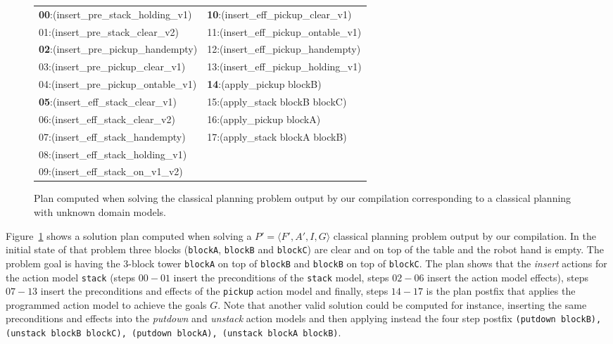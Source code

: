 \documentclass{article}
\newcommand{\tup}[1]{{\langle #1 \rangle}}
\begin{document}
\begin{figure}[hbt!]
	{\tiny\tt

\begin{tabular}{ll}
		{\bf 00}:(insert\_pre\_stack\_holding\_v1) & {\bf 10}:(insert\_eff\_pickup\_clear\_v1) \\
		01:(insert\_pre\_stack\_clear\_v2) & 11:(insert\_eff\_pickup\_ontable\_v1)\\
                {\bf 02}:(insert\_pre\_pickup\_handempty) & 12:(insert\_eff\_pickup\_handempty)\\
                03:(insert\_pre\_pickup\_clear\_v1) & 13:(insert\_eff\_pickup\_holding\_v1)\\
                04:(insert\_pre\_pickup\_ontable\_v1) & {\bf 14}:(apply\_pickup blockB)\\
                {\bf 05}:(insert\_eff\_stack\_clear\_v1) & 15:(apply\_stack blockB blockC)\\
                06:(insert\_eff\_stack\_clear\_v2) & 16:(apply\_pickup blockA)\\
                07:(insert\_eff\_stack\_handempty) & 17:(apply\_stack blockA blockB) \\
                08:(insert\_eff\_stack\_holding\_v1) & \\
                09:(insert\_eff\_stack\_on\_v1\_v2) &             		 
\end{tabular}
}
	\caption{\small Plan computed when solving the classical planning problem output by our compilation corresponding to a classical planning with unknown domain models.}
	\label{fig:plan-lplan}
\end{figure}

Figure~\ref{fig:plan-lplan} shows a solution plan computed when solving a $P'=\tup{F',A',I,G}$ classical planning problem output by our compilation. In the initial state of that problem three  blocks ({\small\tt blockA}, {\small\tt blockB} and {\small\tt blockC}) are clear and on top of the table and the robot hand is empty. The problem goal is having the 3-block tower {\tt blockA} on top of {\tt blockB} and {\tt blockB} on top of {\tt blockC}. The plan shows that the {\em insert} actions for the action model {\tt\small stack} (steps $00-01$ insert the preconditions of the {\tt\small stack} model, steps $02-06$ insert the action model effects), steps $07-13$ insert the preconditions and effects of the {\tt\small pickup} action model and finally, steps $14-17$ is the plan postfix that applies the programmed action model to achieve the goals $G$. Note that another valid solution could be computed for instance, inserting the same preconditions and effects into the {\em putdown} and {\em unstack} action models and then applying instead the four step postfix {\tt\small (putdown blockB), (unstack blockB blockC), (putdown blockA), (unstack blockA blockB)}.
\end{document}
